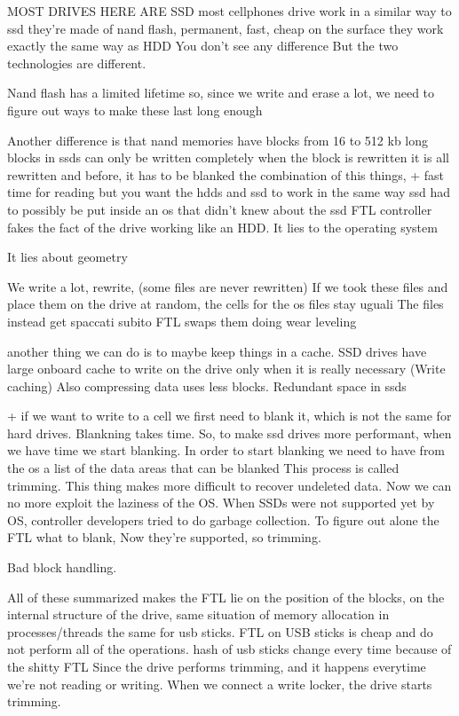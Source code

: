 MOST DRIVES HERE ARE SSD
    most cellphones drive work in a similar way to ssd 
    they're made of nand flash, permanent, fast, cheap 
    on the surface they work exactly the same way as HDD
    You don't see any difference 
    But the two technologies are different.

    Nand flash has a limited lifetime 
    so, since we write and erase a lot, we need to figure out ways to make these last long enough
    
    Another difference is that nand memories have blocks from 16 to 512 kb long
    blocks in ssds can only be written completely
    when the block is rewritten it is all rewritten
    and before, it has to be blanked
    the combination of this things, + fast time for reading
    but you want the hdds and ssd to work in the same way 
    ssd had to possibly be put inside an os that didn't knew about the ssd 
    FTL controller fakes the fact of the drive working like an HDD.
    It lies to the operating system 

    It lies about geometry 

    We write a lot, rewrite, (some files are never rewritten)
    If we took these files and place them on the drive at random, the cells for the os files stay uguali
    The files instead get spaccati subito   
    FTL swaps them doing wear leveling 

    another thing we can do is to maybe keep things in a cache. SSD drives have large onboard cache to write on the drive only when it is really necessary  
    (Write caching)
    Also compressing data uses less blocks.
    Redundant space in ssds 

    + if we want to write to a cell we first need to blank it, which is not the same for hard drives.
    Blankning takes time. So, to make ssd drives more performant, when we have time we start blanking.
    In order to start blanking we need to have from the os a list of the data areas that can be blanked
    This process is called trimming.
    This thing makes more difficult to recover undeleted data. Now we can no more exploit the laziness of the OS.
    When SSDs were not supported yet by OS, controller developers tried to do garbage collection. To figure out alone the FTL what to blank,
    Now they're supported, so trimming.

    Bad block handling.

    All of these summarized makes the FTL lie on the position of the blocks, on the internal structure of the drive, 
    same situation of memory allocation in processes/threads
    the same for usb sticks. FTL on USB sticks is cheap and do not perform all of the operations.
    hash of usb sticks change every time because of the shitty FTL 
    Since the drive performs trimming, and it happens everytime we're not reading or writing. When we connect a write locker, the drive starts trimming.
